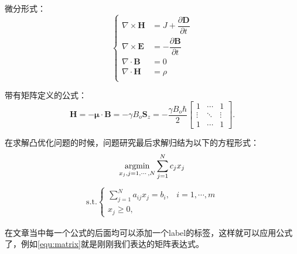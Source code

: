 微分形式：
\begin{equation}
    \begin{cases}
        \nabla\times\mathbf{H}&=J+\dfrac{\partial\mathbf{D}}{\partial{t}}\\
        \nabla\times\mathbf{E}&=-\dfrac{\partial\mathbf{B}}{\partial{t}}\\
        \nabla\cdot\mathbf{B}&=0\\
        \nabla\cdot\mathbf{H}&=\rho\\
    \end{cases}
    \label{equ:diff-function}
\end{equation}

带有矩阵定义的公式：
\begin{equation}
    \mathbf{H} = -\mathbf\mu \cdot \mathbf{B} = -\gamma B_o \mathbf{S}_z = -\frac{\gamma B_o\hbar}{2} 
        \begin{bmatrix}
            1& \cdots &1\\ 
            \vdots & \ddots & \vdots \\
            1 & \cdots & 1 
        \end{bmatrix}.
    \label{equ:matrix}
\end{equation}

在求解凸优化问题的时候，问题研究最后求解归结为以下的方程形式：
\begin{equation}
    \mathop{\mathrm{argmin}}\limits_{x_{j},j=1,\cdots,N}\sum\limits_{j=1}^{N}c_{j}x_{j}
\end{equation}
\begin{eqnarray}
    \text{s.t.}\begin{cases}
        \sum\limits_{j=1}^{N}a_{ij}x_{j}=b_{i},&i=1,\cdots,{m}\\
        x_{j}\geq{0},
    \end{cases}
\end{eqnarray}

在文章当中每一个公式的后面均可以添加一个label的标签，这样就可以应用公式了，例如\cref{equ:matrix}就是刚刚我们表达的矩阵表达式。


